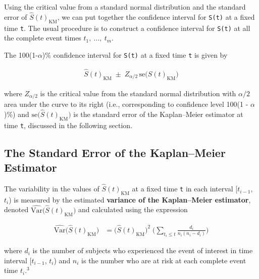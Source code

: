 \documentclass[
]{report}
\begin{document}
Using the critical value from a standard normal distribution and the standard error of \(\scriptstyle \hat S(t)_{\mathrm{KM}}\), we can put together the confidence interval for \texttt{S(t)} at a fixed time \texttt{t}. The usual procedure is to construct a confidence interval for \texttt{S(t)} at all the complete event times \(\scriptstyle t_1,\ \dots,\ t_m\).

The 100(1-\(\scriptstyle \alpha\))\% confidence interval for \texttt{S(t)} at a fixed time \texttt{t} is given by

\begin{align}\label{9.7}
\hat S(t)_{\mathrm{KM}} \;\pm\; Z_{\alpha/2}\,\mathrm{se}\bigl(\hat S(t)_{\mathrm{KM}}\bigr)
\tag{7.7}
\end{align}

where \(\scriptstyle Z_{\alpha/2}\) is the critical value from the standard normal distribution with \(\scriptstyle \alpha/2\) area under the curve to its right (i.e., corresponding to confidence level 100(1 - \(\scriptstyle\alpha\))\%) and \(\scriptstyle \mathrm{se}\bigl(\hat S(t)_{\mathrm{KM}}\bigr)\) is the standard error of the Kaplan--Meier estimator at time \texttt{t}, discussed in the following section.

\hypertarget{the-standard-error-of-the-kaplanmeier-estimator}{%
\subsection*{The Standard Error of the Kaplan--Meier Estimator}\label{the-standard-error-of-the-kaplanmeier-estimator}}

The variability in the values of \(\scriptstyle \hat S(t)_{\mathrm{KM}}\) at a fixed time \texttt{t} in each interval {[}\(\scriptstyle t_{i-1}\), \(\scriptstyle t_i\)) is measured by the estimated \textbf{variance of the Kaplan--Meier estimator}, denoted \(\scriptstyle\widehat{\mathrm{Var}}\bigl(\hat S(t)_{\mathrm{KM}}\bigr)\) and calculated using the expression

\begin{align}\label{9.8}
\widehat{\mathrm{Var}}\bigl(\hat S(t)_{\mathrm{KM}}\bigr)
&= \bigl(\hat S(t)_{\mathrm{KM}}\bigr)^2 \;\biggl(\sum_{t_i \le t}\frac{d_i}{n_i(n_i - d_i)}\biggr)
\tag{7.8}
\end{align}

where \(\scriptstyle d_i\) is the number of subjects who experienced the event of interest in time interval {[}\(\scriptstyle t_{i-1}\), \(\scriptstyle t_i\)) and \(\scriptstyle n_i\) is the number who are at risk at each complete event time \(\scriptstyle t_i\).\(^3\)
\end{document}
